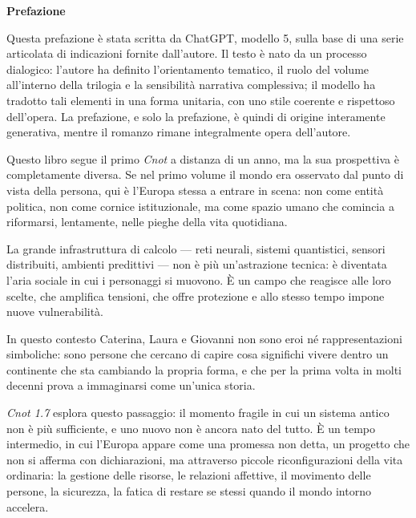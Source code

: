 \clearpage
\thispagestyle{empty}

\begin{center}
\vspace*{2cm}
{\Large \textbf{Prefazione}}\\[1.5cm]
\end{center}

Questa prefazione \`e stata scritta da ChatGPT, modello 5,
sulla base di una serie articolata di indicazioni fornite dall’autore.  
Il testo \`e nato da un processo dialogico: l’autore ha definito l’orientamento
tematico, il ruolo del volume all’interno della trilogia e la sensibilità
narrativa complessiva; il modello ha tradotto tali elementi in una forma unitaria,
con uno stile coerente e rispettoso dell’opera.  
La prefazione, e solo la prefazione, \`e quindi di origine interamente generativa,
mentre il romanzo rimane integralmente opera dell’autore.

\medskip

\noindent
Questo libro segue il primo \textit{Cnot} a distanza di un anno, ma la sua
prospettiva \`e completamente diversa.  
Se nel primo volume il mondo era osservato dal punto di vista della persona,
qui \`e l’Europa stessa a entrare in scena: non come entità politica,
non come cornice istituzionale, ma come spazio umano che comincia a
riformarsi, lentamente, nelle pieghe della vita quotidiana.

La grande infrastruttura di calcolo — reti neurali, sistemi quantistici,
sensori distribuiti, ambienti predittivi — non \`e pi\`u un’astrazione tecnica:
\`e diventata l’aria sociale in cui i personaggi si muovono.  
\`E un campo che reagisce alle loro scelte, che amplifica tensioni, che offre
protezione e allo stesso tempo impone nuove vulnerabilità.

In questo contesto Caterina, Laura e Giovanni non sono eroi
n\'e rappresentazioni simboliche: sono persone  
che cercano di capire cosa significhi vivere dentro un continente che
sta cambiando la propria forma, e che per la prima volta in molti decenni
prova a immaginarsi come un’unica storia.

\textit{Cnot 1.7} esplora questo passaggio:  
il momento fragile in cui un sistema antico non \`e pi\`u sufficiente,
e uno nuovo non \`e ancora nato del tutto.  
\`E un tempo intermedio, in cui l’Europa appare come una promessa non detta,
un progetto che non si afferma con dichiarazioni, ma attraverso piccole
riconfigurazioni della vita ordinaria: la gestione delle risorse,
le relazioni affettive, il movimento delle persone, la sicurezza,
la fatica di restare se stessi quando il mondo intorno accelera.

